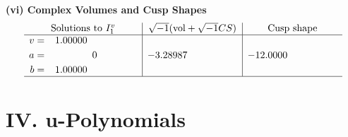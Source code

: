 \documentclass[1p]{elsarticle_modified}
\theoremstyle{definition}
\newcommand{\I}{\sqrt{-1}}
\begin{document}
\newpage\flushleft \textbf{(vi) Complex Volumes and Cusp Shapes}
$$\begin{array}{c|c|c}  
\text{Solutions to }I^v_{1}& \I (\text{vol} + \sqrt{-1}CS) & \text{Cusp shape}\\
 \hline 
\begin{aligned}
v &= \phantom{-}1.00000\phantom{ +0.000000I} \\
a &= \phantom{-0.000000 } 0 \\
b &= \phantom{-}1.00000\phantom{ +0.000000I}\end{aligned}
 & -3.28987\phantom{ +0.000000I} & -12.0000\phantom{ +0.000000I}\\
 \hline 
 \end{array}$$\newpage
\newpage\renewcommand{\arraystretch}{1}
\centering \section*{ IV. u-Polynomials}
\end{document}
